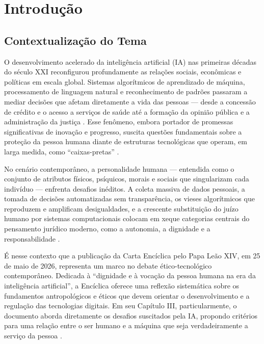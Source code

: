 
\chapter{Introdução}
\label{cap:introducao}

\section{Contextualização do Tema}
\label{sec:contextualizacao}

O desenvolvimento acelerado da inteligência artificial (IA) nas primeiras décadas do século XXI reconfigurou profundamente as relações sociais, econômicas e políticas em escala global. Sistemas algorítmicos de aprendizado de máquina, processamento de linguagem natural e reconhecimento de padrões passaram a mediar decisões que afetam diretamente a vida das pessoas --- desde a concessão de crédito e o acesso a serviços de saúde até a formação da opinião pública e a administração da justiça \cite{Floridi2023EI}. Esse fenômeno, embora portador de promessas significativas de inovação e progresso, suscita questões fundamentais sobre a proteção da pessoa humana diante de estruturas tecnológicas que operam, em larga medida, como ``caixas-pretas'' \cite{Pasquale2015BM}.

No cenário contemporâneo, a personalidade humana --- entendida como o conjunto de atributos físicos, psíquicos, morais e sociais que singularizam cada indivíduo --- enfrenta desafios inéditos. A coleta massiva de dados pessoais, a tomada de decisões automatizadas sem transparência, os vieses algorítmicos que reproduzem e amplificam desigualdades, e a crescente substituição do juízo humano por sistemas computacionais colocam em xeque categorias centrais do pensamento jurídico moderno, como a autonomia, a dignidade e a responsabilidade \cite{Zuboff2019SC, Mulholland2021IA}.

É nesse contexto que a publicação da Carta Encíclica \MH{} pelo Papa Leão XIV, em 25 de maio de 2026, representa um marco no debate ético-tecnológico contemporâneo. Dedicada à ``dignidade e à vocação da pessoa humana na era da inteligência artificial'', a Encíclica oferece uma reflexão sistemática sobre os fundamentos antropológicos e éticos que devem orientar o desenvolvimento e a regulação das tecnologias digitais. Em seu Capítulo III, particularmente, o documento aborda diretamente os desafios suscitados pela IA, propondo critérios para uma relação entre o ser humano e a máquina que seja verdadeiramente a serviço da pessoa \cite{LeaoXIV2026MH}.

